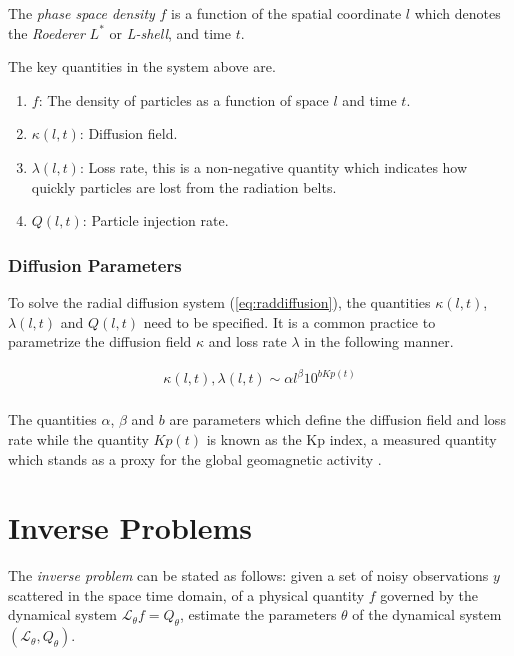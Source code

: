 The \emph{phase space density} $f$ is a function of the spatial
coordinate $l$ which denotes the \emph{Roederer} $L^*$ or
\emph{L-shell}, and time $t$.

The key quantities in the system above are.

\begin{enumerate}
\item $f$: The density of particles as a function of space $l$ and
  time $t$.
\item $\kappa(l, t)$: Diffusion field.
\item $\lambda(l, t)$: Loss rate, this is a non-negative
  quantity which indicates how quickly particles are lost from the
  radiation belts.
\item $Q(l, t)$: Particle injection rate.
\end{enumerate}

\subsubsection*{Diffusion Parameters}

To solve the radial diffusion system (\cref{eq:raddiffusion}), the
quantities $\kappa(l, t)$, $\lambda(l, t)$ and $Q(l, t)$ need to be
specified. It is a common practice \citetext{see \citealp{GRL:GRL10762},
\citealp{JGRA:JGRA15067}, \citealp{JGRA:JGRA18021} and
\citealp{GRL:GRL22815}} to parametrize the diffusion field
$\kappa$ and loss rate $\lambda$ in the following manner.

\begin{align}
  \kappa(l,t), \lambda(l, t) \sim \alpha l^{\beta} 10^{b Kp(t)} \\
\end{align}

The quantities $\alpha$, $\beta$ and $b$ are parameters which define
the diffusion field and loss rate while the quantity $Kp(t)$ is known
as the Kp index, a measured quantity which stands as a proxy for the
global geomagnetic activity \citep{BartelsKp}.


\section{Inverse Problems}\label{sec:inv}

The \emph{inverse problem} can be stated as follows: given a set of
noisy observations $y$ scattered in the space time domain, of a
physical quantity $f$ governed by the dynamical system
$\mathcal{L}_{\theta} f = Q_{\theta}$, estimate the parameters $\theta$ of the
dynamical system $(\mathcal{L}_{\theta}, Q_{\theta})$.

